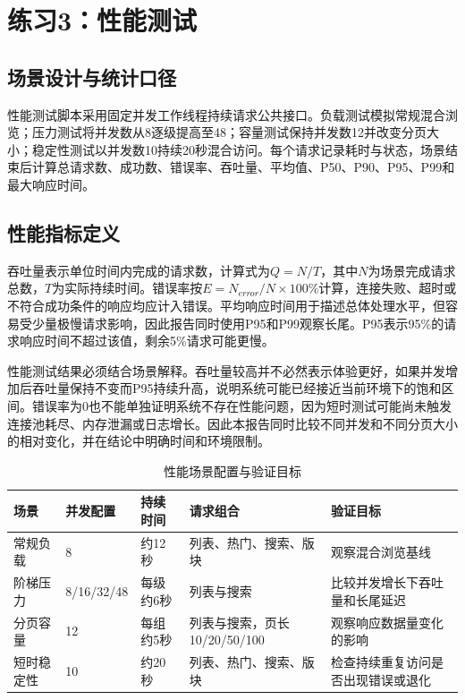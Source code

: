 \documentclass[bwprint]{report}
\begin{document}
\section{练习3：性能测试}

\subsection{场景设计与统计口径}
性能测试脚本采用固定并发工作线程持续请求公共接口。负载测试模拟常规混合浏览；压力测试将并发数从8逐级提高至48；容量测试保持并发数12并改变分页大小；稳定性测试以并发数10持续20秒混合访问。每个请求记录耗时与状态，场景结束后计算总请求数、成功数、错误率、吞吐量、平均值、P50、P90、P95、P99和最大响应时间。

\subsection{性能指标定义}
吞吐量表示单位时间内完成的请求数，计算式为$Q=N/T$，其中$N$为场景完成请求总数，$T$为实际持续时间。错误率按$E=N_{error}/N\times100\%$计算，连接失败、超时或不符合成功条件的响应均应计入错误。平均响应时间用于描述总体处理水平，但容易受少量极慢请求影响，因此报告同时使用P95和P99观察长尾。P95表示95\%的请求响应时间不超过该值，剩余5\%请求可能更慢。

性能测试结果必须结合场景解释。吞吐量较高并不必然表示体验更好，如果并发增加后吞吐量保持不变而P95持续升高，说明系统可能已经接近当前环境下的饱和区间。错误率为0也不能单独证明系统不存在性能问题，因为短时测试可能尚未触发连接池耗尽、内存泄漏或日志增长。因此本报告同时比较不同并发和不同分页大小的相对变化，并在结论中明确时间和环境限制。

\begin{table}[H]
\centering
\caption{性能场景配置与验证目标}
\begin{tabularx}{\textwidth}{P{2.5cm}P{2.0cm}P{2.4cm}Y Y}
\toprule
场景 & 并发配置 & 持续时间 & 请求组合 & 验证目标 \\
\midrule
常规负载 & 8 & 约12秒 & 列表、热门、搜索、版块 & 观察混合浏览基线 \\
阶梯压力 & 8/16/32/48 & 每级约6秒 & 列表与搜索 & 比较并发增长下吞吐量和长尾延迟 \\
分页容量 & 12 & 每组约5秒 & 列表与搜索，页长10/20/50/100 & 观察响应数据量变化的影响 \\
短时稳定性 & 10 & 约20秒 & 列表、热门、搜索、版块 & 检查持续重复访问是否出现错误或退化 \\
\bottomrule
\end{tabularx}
\end{table}
\end{document}
